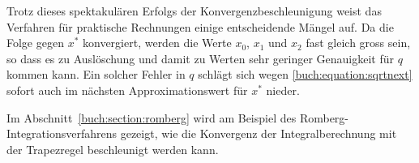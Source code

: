 Trotz dieses spektakulären Erfolgs der Konvergenzbeschleunigung weist das
Verfahren für praktische Rechnungen einige entscheidende Mängel auf.
Da die Folge gegen $x^*$ konvergiert, werden 
die Werte $x_0$, $x_1$ und $x_2$ fast gleich gross sein, so dass es
zu Auslöschung und damit zu Werten sehr geringer Genauigkeit für $q$
kommen kann.
Ein solcher Fehler in $q$ schlägt sich wegen
\eqref{buch:equation:sqrtnext}
sofort auch im nächsten Approximationswert für $x^*$ nieder.

Im Abschnitt~\ref{buch:section:romberg} wird am Beispiel des
Romberg-Integrationsverfahrens gezeigt, wie die Konvergenz der
Integralberechnung mit der Trapezregel beschleunigt werden kann.




